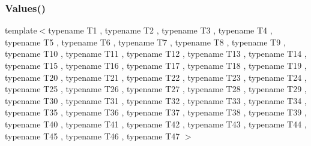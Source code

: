 \mbox{\label{namespacetesting_aba2697b2cd3e9d667ab3807022303240}} 
\subsubsection{\texorpdfstring{Values()}{Values()}\hspace{0.1cm}{\footnotesize\ttfamily [48/51]}}
{\footnotesize\ttfamily template$<$typename T1 , typename T2 , typename T3 , typename T4 , typename T5 , typename T6 , typename T7 , typename T8 , typename T9 , typename T10 , typename T11 , typename T12 , typename T13 , typename T14 , typename T15 , typename T16 , typename T17 , typename T18 , typename T19 , typename T20 , typename T21 , typename T22 , typename T23 , typename T24 , typename T25 , typename T26 , typename T27 , typename T28 , typename T29 , typename T30 , typename T31 , typename T32 , typename T33 , typename T34 , typename T35 , typename T36 , typename T37 , typename T38 , typename T39 , typename T40 , typename T41 , typename T42 , typename T43 , typename T44 , typename T45 , typename T46 , typename T47 $>$ \\
}
